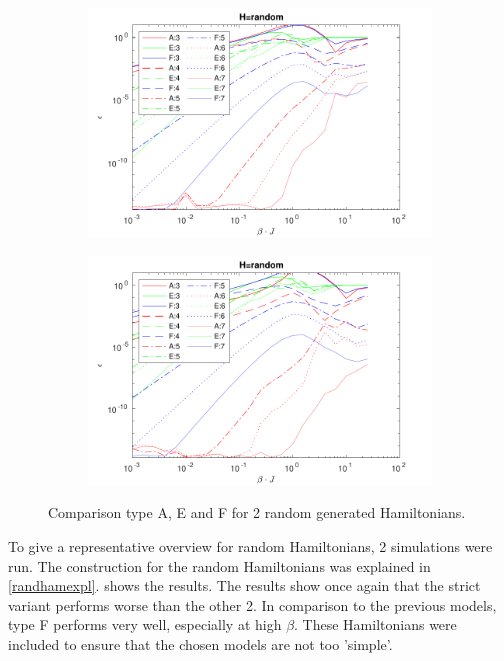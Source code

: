 \begin{figure}[!htbp]
  \begin{subfigure}[]{\textwidth}
    \includegraphics[width=\textwidth]{Figuren/benchmarking/1D_Raand.pdf}
    \subcaption{}
  \end{subfigure}

  \begin{subfigure}[]{\textwidth}
    \includegraphics[width=\textwidth]{Figuren/benchmarking/1D_Raand_2.pdf}
    \subcaption{}
  \end{subfigure}

  \caption{Comparison type A, E and F for 2 random generated Hamiltonians.}
  \label{fig:benchmark:trand}
\end{figure}

To give a representative overview for random Hamiltonians, 2 simulations were run. The construction for the random Hamiltonians was explained in \cref{randhamexpl}.  shows the results. The results show once again that the strict variant performs worse than the other 2. In comparison to the previous models, type F performs very well, especially at high $\beta$.  These Hamiltonians were included to ensure that the chosen models are not too 'simple'.

